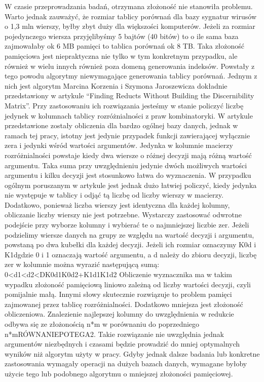 W czasie przeprowadzania badań, otrzymana złożoność nie stanowiła problemu. Warto jednak zauważyć, że rozmiar tablicy porównań dla bazy sygnatur wirusów o 1,3 mln wierszy, byłby zbyt duży dla większości komputerów. Jeżeli za rozmiar pojedynczego wiersza przyjęlibyśmy 5 bajtów (40 bitów) to o ile sama baza zajmowałaby ok 6 MB pamięci to tablica porównań ok 8 TB.
Taka złożoność pamięciowa jest niepraktyczna nie tylko w tym konkretnym przypadku, ale również w wielu innych również poza domeną generowania indeksów. Powstały z tego powodu algorytmy niewymagające generowania tablicy porównań. Jednym z nich jest algorytm Marcina Korzenia i Szymona Jaroszewicza dokładnie przedstawiony w artykule “Finding Reducts Without Building the Discernibility Matrix”.
Przy zastosowaniu ich rozwiązania jesteśmy w stanie policzyć liczbę jedynek w kolumnach tablicy rozróżnialności z praw kombinatoryki. W artykule przedstawione zostały obliczenia dla bardzo ogólnej bazy danych, jednak w ramach tej pracy, istotny jest jedynie przypadek funkcji zawierającej wyłącznie zera i jedynki wśród wartości argumentów. Jedynka w kolumnie macierzy rozróżnialności powstaje kiedy dwa wiersze o różnej decyzji mają różną wartość argumentu. Taka suma przy uwzględnieniu jedynie dwóch możliwych wartości argumentu i kilku decyzji jest stosunkowo łatwa do wyznaczenia. W przypadku ogólnym poruszanym w artykule jest jednak dużo łatwiej policzyć, kiedy jedynka nie występuje w tablicy i odjąć tą liczbę od liczby wierszy w macierzy. Dodatkowo, ponieważ liczba wierszy jest identyczna dla każdej kolumny, obliczanie liczby wierszy nie jest potrzebne. Wystarczy zastosować odwrotne podejście przy wyborze kolumny i wybierać te o najmniejszej liczbie zer.
Jeżeli podzielimy wiersze danych na grupy ze względu na wartość decyzji i argumentu, powstaną po dwa kubełki dla każdej decyzji. Jeżeli ich rozmiar oznaczymy K0d i K1dgdzie 0 i 1 oznaczają wartość argumentu, a d należy do zbioru decyzji, liczbę zer w kolumnie można wyrazić następującą sumą:
0<d1<d2<DK0d1K0d2+K1d1K1d2
Obliczenie wyznacznika ma w takim wypadku złożoność pamięciową liniowo zależną od liczby wartości decyzji, czyli pomijalnie małą. Innymi słowy skutecznie rozwiązuje to problem pamięci zajmowanej przez tablicę rozróżnialności. Dodatkowo mniejsza jest złożoność obliczeniowa. Znalezienie najlepszej kolumny do uwzględnienia w redukcie odbywa się ze złożonością n*m w porównaniu do poprzedniego n*mRÓWNANIEPOTEGA2.
Takie rozwiązanie nie uwzględnia jednak argumentów niezbędnych i czasami będzie prowadzić do mniej optymalnych wyników niż algorytm użyty w pracy. Gdyby jednak dalsze badania lub konkretne zastosowania wymagały operacji na dużych bazach danych, wymagane byłoby użycie tego lub podobnego algorytmu o mniejszej złożoności pamięciowej.

